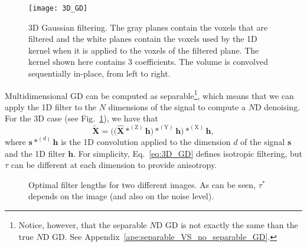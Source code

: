 \documentclass{article}
\begin{document}
\begin{figure}
  \centering
  \texttt{[image: 3D\_GD]}
  \caption{3D Gaussian filtering. The gray planes contain the voxels
    that are filtered and the white planes contain the voxels used by
    the 1D kernel when it is applied to the voxels of the filtered
    plane. The kernel shown here contains 3 coefficients. The volume
    is convolved sequentially in-place, from left to
    right.\label{fig:3D_GD}}
\end{figure}

Multidimensional GD can be computed as separable\footnote{Notice,
  however, that the separable $N$D GD is not exactly the same than the
  true $N$D GD. See Appendix~\ref{ape:separable_VS_no_separable_GD}.},
which means that we can apply the 1D filter to the $N$ dimensions of
the signal to compute a $N$D denoising. For the 3D case (see
Fig.~\ref{fig:3D_GD}), we have that
\begin{equation}
  \tilde{\mathbf{X}} = \Big(\big(\hat{\mathbf X}*^{(\text{Z})}{\mathbf h}\big)*^{(\text{Y})}{\mathbf h}\Big)*^{(\text{X})}{\mathbf h},
    \label{eq:3D_GD}
\end{equation}
where ${\mathbf s}*^{(d)}{\mathbf h}$ is the 1D convolution applied to
the dimension $d$ of the signal ${\mathbf s}$ and the 1D filter
${\mathbf h}$. For simplicity, Eq.~\ref{eq:3D_GD} defines isotropic
filtering, but $\tau$ can be different at each dimension to provide
anisotropy.

\begin{figure}
  \centering
  \caption{Optimal filter lengths for two different images. As can be
    seen, $\tau^*$ depends on the image (and also on the noise
    level).\label{fig:tau_VS_image}}
\end{figure}
\end{document}
